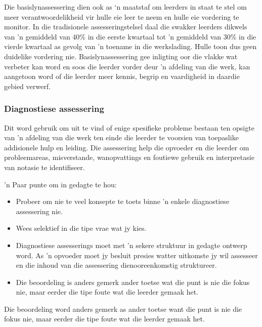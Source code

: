 Die basislynassessering dien ook as ‘n maatstaf om leerders in staat te stel om meer verantwoordelikheid vir hulle eie leer te neem en hulle eie vordering te monitor. In die tradisionele assesseringstelsel daal die swakker leerders dikwels van 'n gemiddeld van 40\% in die eerste kwartaal tot 'n gemiddeld van 30\% in die vierde kwartaal as gevolg van 'n toename in die werkslading. Hulle toon dus geen duidelike vordering nie. Basislynassessering gee inligting oor die vlakke wat verbeter kan word en soos die leerder vorder deur 'n afdeling van die werk, kan aangetoon word of die leerder meer kennis, begrip en vaardigheid in daardie gebied verwerf.

\subsubsection{Diagnostiese assessering}
Dit word gebruik om uit te vind of enige spesifieke probleme bestaan ten opsigte van 'n afdeling van die werk ten einde die leerder te voorsien van toepaslike addisionele hulp en leiding. Die assessering help die opvoeder en die leerder om probleemareas, misverstande, wanopvattings en foutiewe gebruik en interpretasie van notasie te identifiseer.\par

'n Paar punte om in gedagte te hou:
\begin{itemize}[noitemsep]
\item
Probeer om nie te veel konsepte te toets binne 'n enkele diagnostiese assessering nie.
\item
  Wees selektief in die tipe vrae wat jy kies.
\item
  Diagnostiese assesserings moet met 'n sekere struktuur in gedagte ontwerp word. As 'n opvoeder moet jy besluit presies watter uitkomste jy wil assesseer en die inhoud van die assessering dienooreenkomstig struktureer.
\item
  Die beoordeling is anders gemerk ander toetse wat die punt is nie die fokus nie, maar eerder die tipe foute wat die leerder gemaak het.
\end{itemize}
Die beoordeling word anders gemerk as ander toetse want die punt is nie die fokus nie, maar eerder die tipe foute wat die leerder gemaak het.

